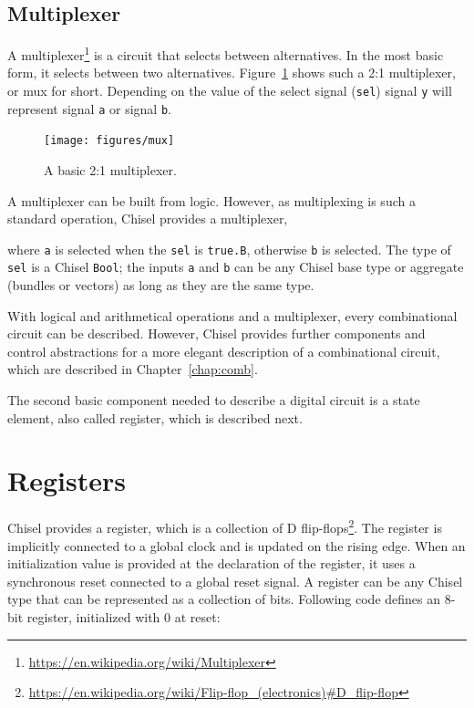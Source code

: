 \documentclass[%
    10pt,
    headinclude, footexclude,
    openright, %
    notitlepage,
    cleardoubleempty,
    headsepline,
    pointlessnumbers,
    bibtotoc, idxtotoc,
    ]{scrbook}
\newcommand{\code}[1]{{\lstinline[basicstyle=\small\ttfamily]{#1}}}
\newcommand{\myref}[2]{\href{#1}{#2}}
\renewcommand{\myref}[2]{{#2}{\footnote{\url{#1}}}}
\begin{document}


\subsection{Multiplexer}


A \myref{https://en.wikipedia.org/wiki/Multiplexer}{multiplexer} is a circuit that selects between alternatives.
In the most basic form, it selects between two alternatives. Figure~\ref{fig:mux} shows
such a 2:1 multiplexer, or mux for short. Depending on the value of the
select signal (\code{sel}) signal \code{y} will represent signal \code{a} or
signal \code{b}.

\begin{figure}
  \centering
  \texttt{[image: figures/mux]}
  \caption{A basic 2:1 multiplexer.}
  \label{fig:mux}
\end{figure}

A multiplexer can be built from logic.
However, as multiplexing  is such a standard operation, Chisel provides a multiplexer,


\noindent where \code{a} is selected when the \code{sel} is \code{true.B}, otherwise \code{b}
is selected. The type of \code{sel} is a Chisel \code{Bool}; the inputs \code{a} and \code{b}
can be any Chisel base type or aggregate (bundles or vectors) as long as they are the same
type.

With logical and arithmetical operations and a multiplexer, every combinational
circuit can be described. However, Chisel provides further components and control abstractions
for a more elegant description of a combinational circuit, which are described in
Chapter~\ref{chap:comb}.

The second basic component needed to describe a digital circuit is a state element,
also called register, which is described next.

\section{Registers}


Chisel provides a register, which is a collection of
\myref{https://en.wikipedia.org/wiki/Flip-flop\_(electronics)\#D\_flip-flop}{D flip-flops}.
The register is implicitly connected to a global clock and is updated on the rising edge.
When an initialization value is provided at the declaration of the register,
it uses a synchronous reset connected to a global reset signal.
A register can be any Chisel type that can be represented as a collection of bits.
Following code defines an 8-bit register, initialized with 0 at reset:
\end{document}
